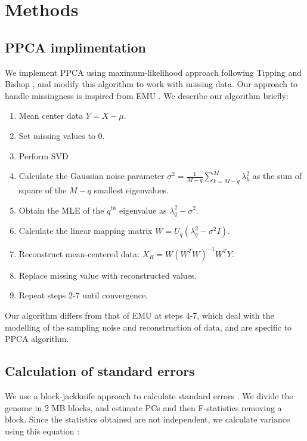 \documentclass[12pt, letterpaper]{article}
\begin{document}
\section{Methods}

\subsection{PPCA implimentation}\label{method-ppca}

We implement PPCA using maximum-likelihood approach following Tipping and                Bishop \cite{tipping_probabilistic_nodate}, and modify this algorithm to work with missing data. Our approach to handle missingness is inspired from EMU \cite{meisner_large-scale_2021}. We describe our algorithm briefly:
\begin{enumerate}
    \item Mean center data $Y = X - \mu$.
    \item Set missing values to 0.
    \item Perform SVD
    \item Calculate the Gaussian noise parameter $\sigma^2 = \frac{1}{M-q} \sum_{k=M-q}^ M \lambda_k^2$ as the sum of square of the $M-q$ smallest eigenvalues.
    \item Obtain the MLE of the $q^{th}$ eigenvalue as $\lambda_q^2 - \sigma^2$.
    \item Calculate the linear mapping matrix $W = U_q (\lambda_q^2 - \sigma^2I)$.
    \item Reconstruct mean-centered data: $X_R = W(W^TW)^{-1}W^TY$.
    \item Replace missing value with reconstructed values.
    \item Repeat steps 2-7 until convergence.
\end{enumerate}

Our algorithm differs from that of EMU at steps 4-7, which deal with the modelling of the sampling noise and reconstruction of data, and are specific to PPCA algorithm.

\subsection{Calculation of standard errors}

We use a block-jackknife approach to calculate standard errors \cite{maier_limits_2022}. We divide the genome in 2 MB blocks, and estimate PCs and then F-statistics removing a block. Since the statistics obtained are not independent, we calculate variance using this equation \cite{maier_limits_2022}:
\end{document}
